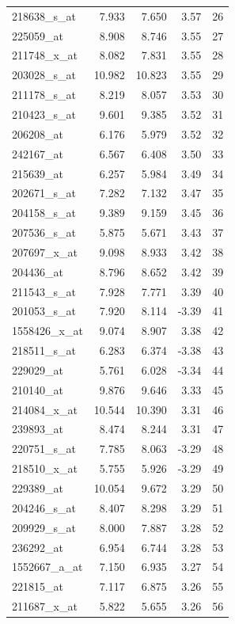 \begin{footnotesize}
\begin{longtable}{lrrrr}
218638\_s\_at & 7.933 & 7.650 & 3.57 & 26 \\
225059\_at & 8.908 & 8.746 & 3.55 & 27 \\
211748\_x\_at & 8.082 & 7.831 & 3.55 & 28 \\
203028\_s\_at & 10.982 & 10.823 & 3.55 & 29 \\
211178\_s\_at & 8.219 & 8.057 & 3.53 & 30 \\
210423\_s\_at & 9.601 & 9.385 & 3.52 & 31 \\
206208\_at & 6.176 & 5.979 & 3.52 & 32 \\
242167\_at & 6.567 & 6.408 & 3.50 & 33 \\
215639\_at & 6.257 & 5.984 & 3.49 & 34 \\
202671\_s\_at & 7.282 & 7.132 & 3.47 & 35 \\
204158\_s\_at & 9.389 & 9.159 & 3.45 & 36 \\
207536\_s\_at & 5.875 & 5.671 & 3.43 & 37 \\
207697\_x\_at & 9.098 & 8.933 & 3.42 & 38 \\
204436\_at & 8.796 & 8.652 & 3.42 & 39 \\
211543\_s\_at & 7.928 & 7.771 & 3.39 & 40 \\
201053\_s\_at & 7.920 & 8.114 & -3.39 & 41 \\
1558426\_x\_at & 9.074 & 8.907 & 3.38 & 42 \\
218511\_s\_at & 6.283 & 6.374 & -3.38 & 43 \\
229029\_at & 5.761 & 6.028 & -3.34 & 44 \\
210140\_at & 9.876 & 9.646 & 3.33 & 45 \\
214084\_x\_at & 10.544 & 10.390 & 3.31 & 46 \\
239893\_at & 8.474 & 8.244 & 3.31 & 47 \\
220751\_s\_at & 7.785 & 8.063 & -3.29 & 48 \\
218510\_x\_at & 5.755 & 5.926 & -3.29 & 49 \\
229389\_at & 10.054 & 9.672 & 3.29 & 50 \\
204246\_s\_at & 8.407 & 8.298 & 3.29 & 51 \\
209929\_s\_at & 8.000 & 7.887 & 3.28 & 52 \\
236292\_at & 6.954 & 6.744 & 3.28 & 53 \\
1552667\_a\_at & 7.150 & 6.935 & 3.27 & 54 \\
221815\_at & 7.117 & 6.875 & 3.26 & 55 \\
211687\_x\_at & 5.822 & 5.655 & 3.26 & 56 \\

\end{longtable}
\end{footnotesize}
